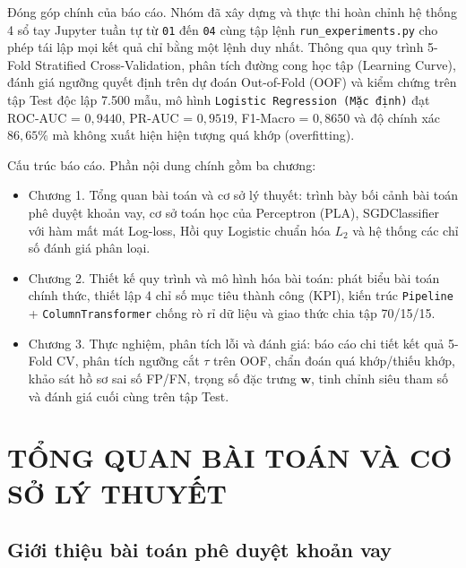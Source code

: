 \documentclass[12pt,a4paper,oneside]{report}
\begin{document}
Đóng góp chính của báo cáo. Nhóm đã xây dựng và thực thi hoàn chỉnh hệ thống 4 sổ tay Jupyter tuần tự từ \texttt{01} đến \texttt{04} cùng tập lệnh \texttt{run\_experiments.py} cho phép tái lập mọi kết quả chỉ bằng một lệnh duy nhất. Thông qua quy trình 5-Fold Stratified Cross-Validation, phân tích đường cong học tập (Learning Curve), đánh giá ngưỡng quyết định trên dự đoán Out-of-Fold (OOF) và kiểm chứng trên tập Test độc lập 7.500 mẫu, mô hình \texttt{Logistic Regression (Mặc định)} đạt ROC-AUC = $0{,}9440$, PR-AUC = $0{,}9519$, F1-Macro = $0{,}8650$ và độ chính xác $86{,}65\%$ mà không xuất hiện hiện tượng quá khớp (overfitting).

Cấu trúc báo cáo. Phần nội dung chính gồm ba chương:
\begin{itemize}
  \item Chương 1. Tổng quan bài toán và cơ sở lý thuyết: trình bày bối cảnh bài toán phê duyệt khoản vay, cơ sở toán học của Perceptron (PLA), SGDClassifier với hàm mất mát Log-loss, Hồi quy Logistic chuẩn hóa $L_2$ và hệ thống các chỉ số đánh giá phân loại.
  \item Chương 2. Thiết kế quy trình và mô hình hóa bài toán: phát biểu bài toán chính thức, thiết lập 4 chỉ số mục tiêu thành công (KPI), kiến trúc \texttt{Pipeline} + \texttt{ColumnTransformer} chống rò rỉ dữ liệu và giao thức chia tập 70/15/15.
  \item Chương 3. Thực nghiệm, phân tích lỗi và đánh giá: báo cáo chi tiết kết quả 5-Fold CV, phân tích ngưỡng cắt $\tau$ trên OOF, chẩn đoán quá khớp/thiếu khớp, khảo sát hồ sơ sai số FP/FN, trọng số đặc trưng $\mathbf{w}$, tinh chỉnh siêu tham số và đánh giá cuối cùng trên tập Test.
\end{itemize}

\clearpage
{}
\pagestyle{fancy}

\chapter{TỔNG QUAN BÀI TOÁN VÀ CƠ SỞ LÝ THUYẾT}

\section{Giới thiệu bài toán phê duyệt khoản vay}
\end{document}
